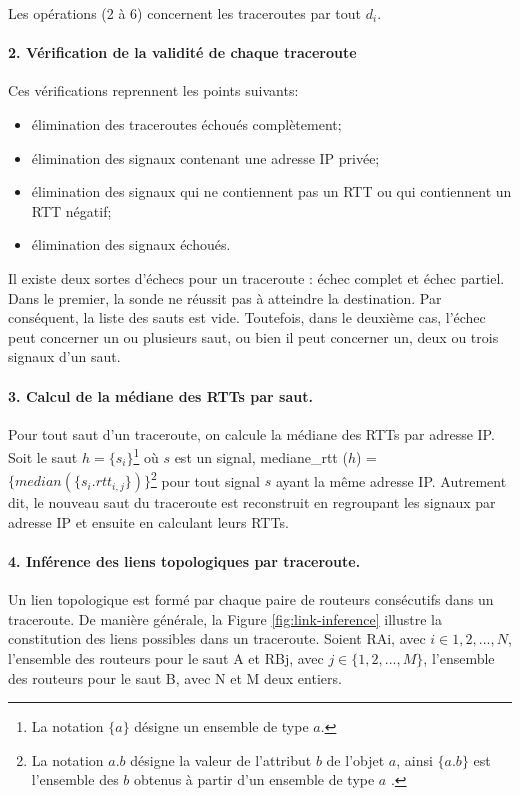 Les opérations  (2 à 6) concernent  les traceroutes par tout $d_i$.  

\paragraph{2. Vérification de la validité de chaque traceroute} Ces vérifications reprennent les points suivants:
\begin{itemize}
	\item élimination des traceroutes échoués complètement;
	\item élimination des signaux contenant une adresse IP privée;
	\item élimination des signaux qui ne contiennent pas un RTT ou  qui contiennent un RTT négatif;
	\item  élimination des signaux échoués.
\end{itemize}

Il existe deux sortes d'échecs pour un traceroute : échec complet et échec partiel. Dans le premier,   la sonde ne réussit pas à atteindre la destination. Par conséquent, la liste des sauts est vide. Toutefois, dans le deuxième cas, l'échec peut concerner un ou plusieurs saut, ou bien il peut concerner un, deux ou trois signaux d'un saut.


\paragraph{3. Calcul de la médiane des RTTs par saut.} Pour tout saut d'un traceroute,  on calcule la médiane des RTTs par adresse IP. Soit le saut $h =\{s_i \}$\footnote{La notation $\{ a\}$ désigne un ensemble de type $a$.} où $s$ est un  signal, mediane\_rtt ($h$) =  $\{median(\{s_i.rtt_{i, j}\})\}$\footnote{La notation $a.b$ désigne la valeur de l'attribut $b$ de l'objet $a$, ainsi $\{a.b\}$ est l'ensemble des $b$ obtenus à partir d'un ensemble de type $a$ .}  pour tout signal $s$ ayant la même adresse IP. Autrement dit, le nouveau saut du traceroute est reconstruit en regroupant les signaux par adresse IP et ensuite en calculant leurs RTTs. 




\paragraph{4. Inférence des liens topologiques par traceroute.} Un lien topologique est formé par chaque paire de routeurs consécutifs dans un traceroute. De manière générale, la Figure \ref{fig:link-inference} illustre la constitution des liens possibles  dans un traceroute. Soient  RAi, avec $i \in {1,2, ...,N}$,  l'ensemble des routeurs pour le saut A et RBj, avec $j \in \{1,2, ..., M\}$, l'ensemble  des routeurs pour le saut B, avec N et M deux entiers.




